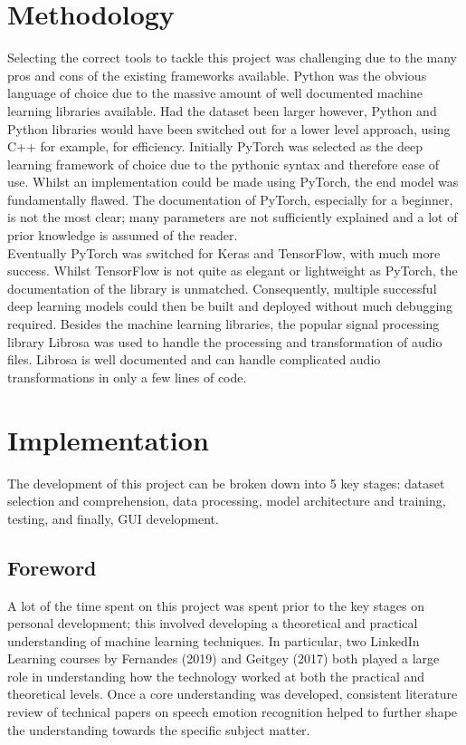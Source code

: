 \documentclass[12pt]{article}
\begin{document}
\section{Methodology}
Selecting the correct tools to tackle this project was challenging due to the many pros and cons of the existing frameworks available. Python was the obvious language of choice due to the massive amount of well documented machine learning libraries available. Had the dataset been larger however, Python and Python libraries would have been switched out for a lower level approach, using C++ for example, for efficiency. Initially PyTorch was selected as the deep learning framework of choice due to the pythonic syntax and therefore ease of use. Whilst an implementation could be made using PyTorch, the end model was fundamentally flawed. The documentation of PyTorch, especially for a beginner, is not the most clear; many parameters are not sufficiently explained and a lot of prior knowledge is assumed of the reader.
\\

\noindent Eventually PyTorch was switched for Keras and TensorFlow, with much more success. Whilst TensorFlow is not quite as elegant or lightweight as PyTorch, the documentation of the library is unmatched. Consequently, multiple successful deep learning models could then be built and deployed without much debugging required. Besides the machine learning libraries, the popular signal processing library Librosa was used to handle the processing and transformation of audio files. Librosa is well documented and can handle complicated audio transformations in only a few lines of code.

\section{Implementation}
The development of this project can be broken down into 5 key stages: dataset selection and comprehension, data processing, model architecture and training, testing, and finally, GUI development.
\subsection{Foreword}
A lot of the time spent on this project was spent prior to the key stages on personal development; this involved developing a theoretical and practical understanding of machine learning techniques. In particular, two LinkedIn Learning courses by Fernandes (2019) and Geitgey (2017) both played a large role in understanding how the technology worked at both the practical and theoretical levels. Once a core understanding was developed, consistent literature review of technical papers on speech emotion recognition helped to further shape the understanding towards the specific subject matter. 
\end{document}
